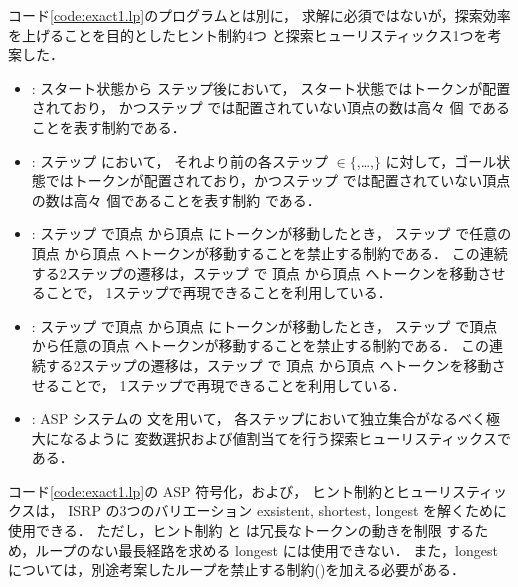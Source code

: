 コード\ref{code:exact1.lp}のプログラムとは別に，
求解に必須ではないが，探索効率を上げることを目的としたヒント制約4つ
と探索ヒューリスティックス1つを考案した．
\begin{itemize}
\item {}:
  スタート状態から  ステップ後において，
  スタート状態ではトークンが配置されており，
  かつステップ  では配置されていない頂点の数は高々  個
  であることを表す制約である．
\item {}:
  ステップ  において，
  それより前の各ステップ  $\in\{$,\ldots,$\}$
  に対して，ゴール状態ではトークンが配置されており，かつステップ 
  では配置されていない頂点の数は高々  個であることを表す制約
  である．
\item {}:
  ステップ  で頂点  から頂点 
  にトークンが移動したとき，
  ステップ  で任意の頂点  から頂点 
  へトークンが移動することを禁止する制約である．
  この連続する2ステップの遷移は，ステップ  で
  頂点  から頂点  へトークンを移動させることで，
  1ステップで再現できることを利用している．
\item {}:
  ステップ  で頂点  から頂点 
  にトークンが移動したとき，
  ステップ  で頂点  から任意の頂点 
  へトークンが移動することを禁止する制約である．
  この連続する2ステップの遷移は，ステップ  で
  頂点  から頂点  へトークンを移動させることで，
  1ステップで再現できることを利用している．
\item {}:
  ASP システム{\clingo}の  文を用いて，
  各ステップにおいて独立集合がなるべく極大になるように
  変数選択および値割当てを行う探索ヒューリスティックスである．
\end{itemize}

コード\ref{code:exact1.lp}の ASP 符号化，および，
ヒント制約とヒューリスティックスは，
ISRP の3つのバリエーション exsistent, shortest, longest
を解くために使用できる．
ただし，ヒント制約  と  は冗長なトークンの動きを制限
するため，ループのない最長経路を求める longest には使用できない．
また，longest については，別途考案したループを禁止する制約()を加える必要がある．

